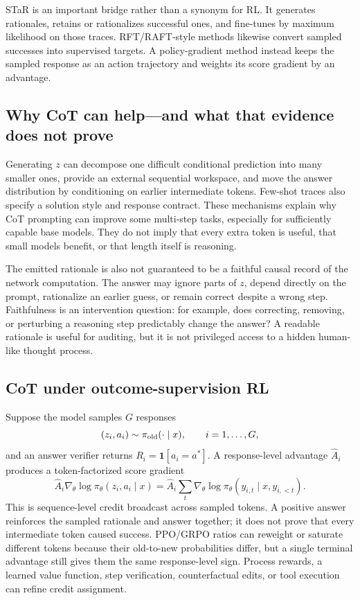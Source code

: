 \documentclass[11pt]{article}
\begin{document}
STaR is an important bridge rather than a synonym for RL.  It generates
rationales, retains or rationalizes successful ones, and fine-tunes by maximum
likelihood on those traces.  RFT/RAFT-style methods likewise convert sampled
successes into supervised targets.  A policy-gradient method instead keeps the
sampled response as an action trajectory and weights its score gradient by an
advantage.

\subsection{Why CoT can help---and what that evidence does not prove}

Generating $z$ can decompose one difficult conditional prediction into many
smaller ones, provide an external sequential workspace, and move the answer
distribution by conditioning on earlier intermediate tokens.  Few-shot traces
also specify a solution style and response contract.  These mechanisms explain
why CoT prompting can improve some multi-step tasks, especially for sufficiently
capable base models.  They do not imply that every extra token is useful, that
small models benefit, or that length itself is reasoning.

The emitted rationale is also not guaranteed to be a faithful causal record of
the network computation.  The answer may ignore parts of $z$, depend directly
on the prompt, rationalize an earlier guess, or remain correct despite a wrong
step.  Faithfulness is an intervention question: for example, does correcting,
removing, or perturbing a reasoning step predictably change the answer?  A
readable rationale is useful for auditing, but it is not privileged access to a
hidden human-like thought process.

\subsection{CoT under outcome-supervision RL}

Suppose the model samples $G$ responses
\[
(z_i,a_i)\sim\pi_{\rm old}(\cdot\mid x),\qquad i=1,\ldots,G,
\]
and an answer verifier returns $R_i=\mathbf 1[a_i=a^*]$.  A response-level
advantage $\hat A_i$ produces a token-factorized score gradient
\[
\hat A_i\nabla_\theta\log\pi_\theta(z_i,a_i\mid x)
=\hat A_i\sum_t\nabla_\theta\log\pi_\theta(y_{i,t}\mid x,y_{i,<t}).
\]
This is sequence-level credit broadcast across sampled tokens.  A positive
answer reinforces the sampled rationale and answer together; it does not prove
that every intermediate token caused success.  PPO/GRPO ratios can reweight or
saturate different tokens because their old-to-new probabilities differ, but a
single terminal advantage still gives them the same response-level sign.
Process rewards, a learned value function, step verification, counterfactual
edits, or tool execution can refine credit assignment.
\end{document}
